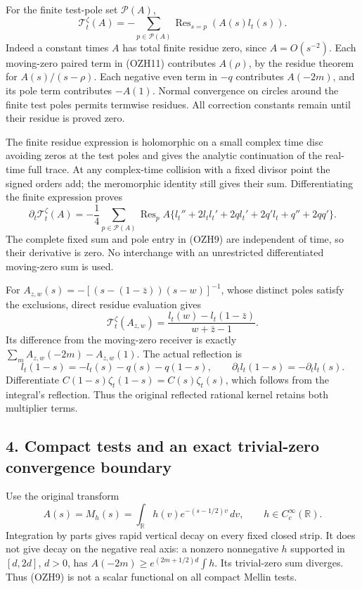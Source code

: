 \documentclass[
  10pt,
  a4paper,
]{article}
\begin{document}
For the finite test-pole set \(\mathcal P(A)\), \[
\boxed{\mathcal T_t^\zeta(A)=
-\sum_{p\in\mathcal P(A)}\operatorname{Res}_{s=p}(A(s)l_t(s)).}
\tag{OZH12}
\] Indeed a constant times \(A\) has total finite residue zero, since
\(A=O(s^{-2})\). Each moving-zero paired term in (OZH11) contributes
\(A(\rho)\), by the residue theorem for \(A(s)/(s-\rho)\). Each negative
even term in \(-q\) contributes \(A(-2m)\), and its pole term
contributes \(-A(1)\). Normal convergence on circles around the finite
test poles permits termwise residues. All correction constants remain
until their residue is proved zero.

The finite residue expression is holomorphic on a small complex time
disc avoiding zeros at the test poles and gives the analytic
continuation of the real-time full trace. At any complex-time collision
with a fixed divisor point the signed orders add; the meromorphic
identity still gives their sum. Differentiating the finite expression
proves \[
\boxed{
\partial_t\mathcal T_t^\zeta(A)=
-\frac14\sum_{p\in\mathcal P(A)}\operatorname{Res}_{p}
A\{l_t''+2l_tl_t'+2q l_t'+2q'l_t+q''+2qq'\}.}
\tag{OZH13}
\] The complete fixed sum and pole entry in (OZH9) are independent of
time, so their derivative is zero. No interchange with an unrestricted
differentiated moving-zero sum is used.

For \(A_{z,w}(s)=-[(s-(1-\bar z))(s-w)]^{-1}\), whose distinct poles
satisfy the exclusions, direct residue evaluation gives \[
\mathcal T_t^\zeta(A_{z,w})=
\frac{l_t(w)-l_t(1-\bar z)}{w+\bar z-1}.
\tag{OZH14}
\] Its difference from the moving-zero receiver is exactly
\(\sum_m A_{z,w}(-2m)-A_{z,w}(1)\). The actual reflection is \[
l_t(1-s)=-l_t(s)-q(s)-q(1-s),\qquad
\partial_t l_t(1-s)=-\partial_t l_t(s).
\tag{OZH15}
\] Differentiate \(C(1-s)\zeta_t(1-s)=C(s)\zeta_t(s)\), which follows
from the integral's reflection. Thus the original reflected rational
kernel retains both multiplier terms.

\subsection{4. Compact tests and an exact trivial-zero convergence
boundary}\label{compact-tests-and-an-exact-trivial-zero-convergence-boundary}

Use the original transform \[
A(s)=M_h(s)=\int_{\mathbb R}h(v)e^{-(s-1/2)v}\,dv,
\qquad h\in C_c^\infty(\mathbb R).
\tag{OZH16}
\] Integration by parts gives rapid vertical decay on every fixed closed
strip. It does not give decay on the negative real axis: a nonzero
nonnegative \(h\) supported in \([d,2d]\), \(d>0\), has
\(A(-2m)\ge e^{(2m+1/2)d}\int h\). Its trivial-zero sum diverges. Thus
(OZH9) is not a scalar functional on all compact Mellin tests.
\end{document}
